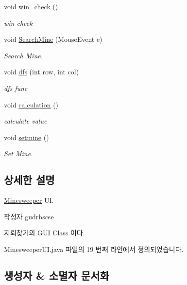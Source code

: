 \begin{DoxyCompactItemize}
\item 
void \hyperlink{classhufs_1_1cse_1_1khk_1_1_minesweeper_u_i_a4bb7cb917ff08bb92313768edfb9e976}{win\+\_\+check} ()
\begin{DoxyCompactList}\small\item\em win check \end{DoxyCompactList}\item 
void \hyperlink{classhufs_1_1cse_1_1khk_1_1_minesweeper_u_i_a11c77f8dd3a89c96b8a32c64f4e2aef5}{Search\+Mine} (Mouse\+Event e)
\begin{DoxyCompactList}\small\item\em Search Mine. \end{DoxyCompactList}\item 
void \hyperlink{classhufs_1_1cse_1_1khk_1_1_minesweeper_u_i_ac9d8adecf10f5e6f203fc979fe032963}{dfs} (int row, int col)
\begin{DoxyCompactList}\small\item\em dfs func \end{DoxyCompactList}\item 
void \hyperlink{classhufs_1_1cse_1_1khk_1_1_minesweeper_u_i_a87c73fb5d1f5cc33c8ca0a7b337849d3}{calculation} ()
\begin{DoxyCompactList}\small\item\em calculate value \end{DoxyCompactList}\item 
void \hyperlink{classhufs_1_1cse_1_1khk_1_1_minesweeper_u_i_a9649859be1093b220e48f02b27171a9d}{setmine} ()
\begin{DoxyCompactList}\small\item\em Set Mine. \end{DoxyCompactList}\end{DoxyCompactItemize}


\subsection{상세한 설명}
\hyperlink{classhufs_1_1cse_1_1khk_1_1_minesweeper}{Minesweeper} UI. 

\begin{DoxyAuthor}{작성자}
gudrbscse
\end{DoxyAuthor}
지뢰찾기의 G\+UI Class 이다. 

Minesweeper\+U\+I.\+java 파일의 19 번째 라인에서 정의되었습니다.



\subsection{생성자 \& 소멸자 문서화}
